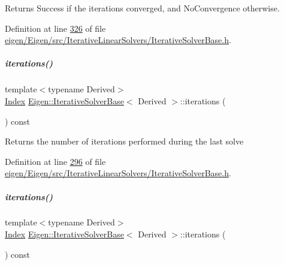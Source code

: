 \begin{DoxyReturn}{Returns}
Success if the iterations converged, and No\+Convergence otherwise. 
\end{DoxyReturn}


Definition at line \hyperlink{eigen_2_eigen_2src_2_iterative_linear_solvers_2_iterative_solver_base_8h_source_l00326}{326} of file \hyperlink{eigen_2_eigen_2src_2_iterative_linear_solvers_2_iterative_solver_base_8h_source}{eigen/\+Eigen/src/\+Iterative\+Linear\+Solvers/\+Iterative\+Solver\+Base.\+h}.

\mbox{\label{group___iterative_linear_solvers___module_ae778dd098bd5e6655625b20b1e9f15da}} 
\subparagraph{\texorpdfstring{iterations()}{iterations()}\hspace{0.1cm}{\footnotesize\ttfamily [1/2]}}
{\footnotesize\ttfamily template$<$typename Derived$>$ \\
\hyperlink{namespace_eigen_a62e77e0933482dafde8fe197d9a2cfde}{Index} \hyperlink{group___iterative_linear_solvers___module_class_eigen_1_1_iterative_solver_base}{Eigen\+::\+Iterative\+Solver\+Base}$<$ Derived $>$\+::iterations (\begin{DoxyParamCaption}{ }\end{DoxyParamCaption}) const\hspace{0.3cm}{\ttfamily [inline]}}

\begin{DoxyReturn}{Returns}
the number of iterations performed during the last solve 
\end{DoxyReturn}


Definition at line \hyperlink{eigen_2_eigen_2src_2_iterative_linear_solvers_2_iterative_solver_base_8h_source_l00296}{296} of file \hyperlink{eigen_2_eigen_2src_2_iterative_linear_solvers_2_iterative_solver_base_8h_source}{eigen/\+Eigen/src/\+Iterative\+Linear\+Solvers/\+Iterative\+Solver\+Base.\+h}.

\mbox{\label{group___iterative_linear_solvers___module_ae778dd098bd5e6655625b20b1e9f15da}} 
\subparagraph{\texorpdfstring{iterations()}{iterations()}\hspace{0.1cm}{\footnotesize\ttfamily [2/2]}}
{\footnotesize\ttfamily template$<$typename Derived$>$ \\
\hyperlink{namespace_eigen_a62e77e0933482dafde8fe197d9a2cfde}{Index} \hyperlink{group___iterative_linear_solvers___module_class_eigen_1_1_iterative_solver_base}{Eigen\+::\+Iterative\+Solver\+Base}$<$ Derived $>$\+::iterations (\begin{DoxyParamCaption}{ }\end{DoxyParamCaption}) const\hspace{0.3cm}{\ttfamily [inline]}}

